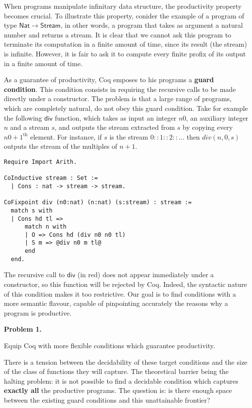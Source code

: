 \documentclass[11pt,twocolumn]{article}
\begin{document}
When programs manipulate infinitary data structure, the productivity property becomes crucial. To illustrate this property, conider the example of a program of type $\mathsf{Nat}\rightarrow \mathsf{Stream}$, in other words, a program that takes as argument a natural number and returns a stream. It is clear that we cannot ask this program to terminate its computation in a finite amount of time, since its result (the stream) is infinite. However, 
it is fair to ask it to compute every finite profix of its output in a finite amount of time. 


 
As a guarantee of productivity, Coq emposes to his programs a \textbf{guard condition}.
This condition consists in requiring the recursive calls to be made directly under a constructor. The problem is that a large range of programs, which are completely natural, do not obey this guard condition. Take for example the following $\mathsf{div}$ function, which takes as input an integer $n0$, an auxiliary integer $n$ and a stream $s$, and outputs the stream extracted from $s$ by copying every $n0+1^{\text{th}}$ element. For instance, if $s$ is the stream     
  $0::1::2::\dots$ then $div(n,0,s)$ outputs the stream of the multiples of $n+1$. 
\begin{lstlisting}[style=base]
Require Import Arith.

CoInductive stream : Set :=
  | Cons : nat -> stream -> stream.

CoFixpoint div (n0:nat) (n:nat) (s:stream) : stream :=
  match s with
  | Cons hd tl =>
      match n with
      | O => Cons hd (div n0 n0 tl)
      | S m => @div n0 m tl@
      end
  end.
\end{lstlisting}
The recursive call to $\mathsf{div}$ (in red) does not appear immediately under a constructor, so this function will be rejected by Coq.
  Indeed, the syntactic nature of this condition makes it too restrictive. 
Our goal is to find conditions with a more semantic flavour, capable of pinpointing accurately the reasons why a program is productive.

\begin{center}
\begin{bclogo}[logo= ,arrondi = 0.1, couleur = green!10,  epBarre = 0]{}
  \vspace{-10pt}
  \textbf{Problem 1.}
  
  Equip Coq with more flexible conditions which guarantee productivity. 
\end{bclogo}
\end{center}
There is a tension  between the decidability of these target conditions and the size of the class of functions they will capture. The theoretical barrier being the halting problem:
it is not possible to find a decidable condition which captures \textbf{exactly all} the productive programs. The question is: is there enough space between the existing guard conditions and this unattainable frontier?
\end{document}
